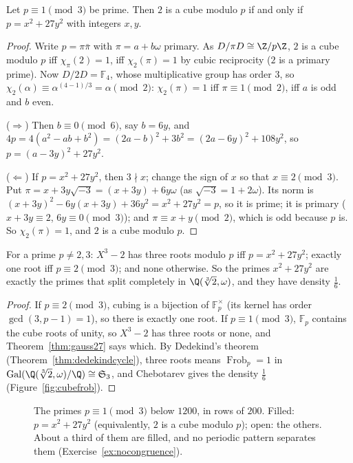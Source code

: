\begin{theorem}[Gauss]\label{thm:gauss27}
Let $p\equiv1\pmod3$ be prime. Then $2$ is a cube modulo $p$ if and only if $p=x^2+27y^2$ with integers $x,y$.
\end{theorem}
\begin{proof}
Write $p=\pi\bar\pi$ with $\pi=a+b\omega$ primary. As $D/\pi D\cong\Z/p\Z$, $2$ is a cube modulo $p$ iff $\chi_\pi(2)=1$, iff $\chi_2(\pi)=1$ by cubic reciprocity
($2$ is a primary prime). Now $D/2D=\mathbb F_4$, whose multiplicative group has order $3$, so $\chi_2(\alpha)\equiv\alpha^{(4-1)/3}=\alpha\pmod 2$: $\chi_2(\pi)=1$
iff $\pi\equiv1\pmod2$, iff $a$ is odd and $b$ even.

($\Rightarrow$) Then $b\equiv0\pmod6$, say $b=6y$, and $4p=4(a^2-ab+b^2)=(2a-b)^2+3b^2=(2a-6y)^2+108y^2$, so $p=(a-3y)^2+27y^2$.

($\Leftarrow$) If $p=x^2+27y^2$, then $3\nmid x$; change the sign of $x$ so that $x\equiv2\pmod3$. Put $\pi=x+3y\sqrt{-3}=(x+3y)+6y\omega$ (as
$\sqrt{-3}=1+2\omega$). Its norm is $(x+3y)^2-6y(x+3y)+36y^2=x^2+27y^2=p$, so it is prime; it is primary ($x+3y\equiv2$, $6y\equiv0\pmod3$); and
$\pi\equiv x+y\pmod2$, which is odd because $p$ is. So $\chi_2(\pi)=1$, and $2$ is a cube modulo $p$.
\end{proof}

\begin{corollary}\label{cor:cuberoot2}
For a prime $p\ne2,3$: $X^3-2$ has three roots modulo $p$ iff $p=x^2+27y^2$; exactly one root iff $p\equiv2\pmod3$; and none otherwise. So the primes
$x^2+27y^2$ are exactly the primes that split completely in $\Q(\sqrt[3]2,\omega)$, and they have density $\frac16$.
\end{corollary}
\begin{proof}
If $p\equiv2\pmod3$, cubing is a bijection of $\mathbb F_p^\times$ (its kernel has order $\gcd(3,p-1)=1$), so there is exactly one root. If $p\equiv1\pmod3$,
$\mathbb F_p$ contains the cube roots of unity, so $X^3-2$ has three roots or none, and Theorem~\ref{thm:gauss27} says which. By Dedekind's theorem
(Theorem~\ref{thm:dedekindcycle}), three roots means $\operatorname{Frob}_p=1$ in $\operatorname{Gal}(\Q(\sqrt[3]2,\omega)/\Q)\cong\mathfrak S_3$, and Chebotarev gives the density
$\frac16$ (Figure~\ref{fig:cubefrob}).
\end{proof}

\begin{figure}[ht]
\centering
{}
\caption{The primes $p\equiv1\pmod3$ below $1200$, in rows of $200$. Filled: $p=x^2+27y^2$ (equivalently, $2$ is a cube modulo $p$); open: the others.
About a third of them are filled, and no periodic pattern separates them (Exercise~\ref{ex:nocongruence}).}
\label{fig:gauss27}
\end{figure}

